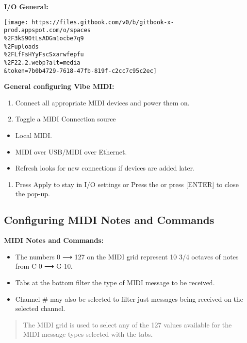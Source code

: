\documentclass[
]{article}
\providecommand{\tightlist}{%
  \setlength{\itemsep}{0pt}\setlength{\parskip}{0pt}}
\begin{document}
\textbf{I/O General:}

\texttt{[image: https://files.gitbook.com/v0/b/gitbook-x-prod.appspot.com/o/spaces\\\%2F3kS90tLsADGm1ocbe7q9\\\%2Fuploads\\\%2FLfFsHYyFscSxarwfepfu\\\%2F22.2.webp?alt=media\\\&token=7b0b4729-7618-47fb-819f-c2cc7c95c2ec]}

\textbf{General configuring Vibe MIDI:}

\begin{enumerate}
\def\labelenumi{\arabic{enumi}.}
\item
  Connect all appropriate MIDI devices and power them on.
\item
  Toggle a MIDI Connection source
\end{enumerate}

\begin{itemize}
\item
  Local MIDI.
\item
  MIDI over USB/MIDI over Ethernet.
\item
  Refresh looks for new connections if devices are added later.
\end{itemize}

\begin{enumerate}
\def\labelenumi{\arabic{enumi}.}
\setcounter{enumi}{2}
\tightlist
\item
  Press Apply to stay in I/O settings or Press the \href{image.png}{} or press {[}ENTER{]} to close the pop-up.
\end{enumerate}

\hypertarget{configuring-midi-notes-and-commands}{%
\subsection{Configuring MIDI Notes and Commands}\label{configuring-midi-notes-and-commands}}

\textbf{MIDI Notes and Commands:}

\begin{itemize}
\item
  The numbers 0 ⟶ 127 on the MIDI grid represent 10 3/4 octaves of notes from C-0 ⟶ G-10.
\item
  Tabs at the bottom filter the type of MIDI message to be received.
\item
  Channel \# may also be selected to filter just messages being received on the selected channel.
\end{itemize}

\begin{quote}
The MIDI grid is used to select any of the 127 values available for the MIDI message types selected with the tabs.
\end{quote}
\end{document}
